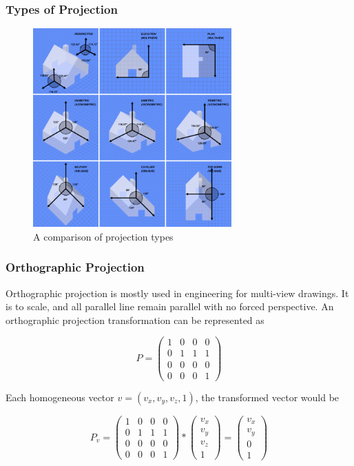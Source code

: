 \documentclass{article}
\begin{document}
\subsubsection{Types of Projection}

\begin{figure}[H]
    \centering
    \includegraphics[width=3.0in]{Graphical_projection_comparison.png}
    \caption{A comparison of projection types}
    \label{projectiontypes}
\end{figure}

\subsubsection{Orthographic Projection}
Orthographic projection is mostly used in engineering for multi-view drawings. It is to scale, and all parallel line remain parallel with no forced perspective. An orthographic projection transformation can be represented as

\[ P = \begin{pmatrix}
  1 & 0 & 0 & 0 \\
  0 & 1 & 1 & 1 \\
  0 & 0 & 0 & 0 \\
  0 & 0 & 0 & 1 
 \end{pmatrix}\]	

Each homogeneous vector $v = (v_x, v_y, v_z, 1)$, the transformed vector would be

\[P_{v} = \begin{pmatrix}
  1 & 0 & 0 & 0 \\
  0 & 1 & 1 & 1 \\
  0 & 0 & 0 & 0 \\
  0 & 0 & 0 & 1 
 \end{pmatrix}	
*
\begin{pmatrix}
  v_{x} \\
  v_{y} \\
  v_{z} \\
  1
 \end{pmatrix}	
=
\begin{pmatrix}
  v_{x} \\
  v_{y} \\
  0 \\
  1
 \end{pmatrix}\]
\end{document}
